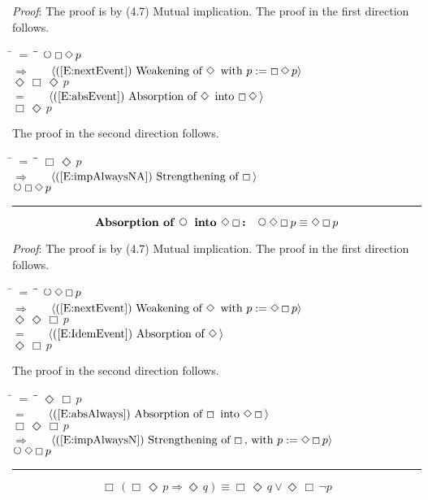\documentclass[12pt, fleqn, leqno]{article}
\newcommand{\lgap}{2pt}                             %
\newcommand{\mymathindent}{24pt}                    %
\newcommand{\impl}{\ensuremath{\Rightarrow}}        %
\newcommand{\Next}{\;\,\text{\raisebox{3.5pt}{\circle{6}}}}
\newcommand{\Event}{\Diamond\,}
\newcommand{\Always}{\Box\,}
\newcommand{\myqed}{\rule[-.23ex]{1.2ex}{2.0ex}}
\newcommand{\myqedtab}{\hspace{384pt}}              %
\newcommand{\Gll} {\langle}                         %
\newcommand{\Ggg} {\rangle}                         %
\newcommand{\Hint}[1]     {\ \ \ $\Gll              \mbox{#1} \Ggg$ }   %
\begin{document}
\emph{Proof}: The proof is by (4.7) Mutual implication.
The proof in the first direction follows.
\begin{tabbing}
\hspace{\mymathindent} \= $= \;$ \= \myqedtab \= \kill
  \> \>   $\Next\Always\Event p$\\[\lgap]
  \> $\impl$  \>  \Hint{(\ref{E:nextEvent}) Weakening of $\Event$ with $p := \Always \Event p$}\\[\lgap]
  \> \>   $\Event\Always\Event p$\\[\lgap]
  \> $=$  \>  \Hint{(\ref{E:absEvent}) Absorption of $\Event$ into $\Always\Event$}\\[\lgap]
  \> \>   $\Always\Event p$
\end{tabbing}
The proof in the second direction follows.
\begin{tabbing}
\hspace{\mymathindent} \= $= \;$ \= \myqedtab \= \kill
  \> \>   $\Always\Event p$\\[\lgap]
  \> $\impl$  \>  \Hint{(\ref{E:impAlwaysNA}) Strengthening of $\Always$}\\[\lgap]
  \> \>   $\Next\Always\Event p$ \quad \myqed
\end{tabbing}
\begin{equation}\label{E:absNextEventAlways}
\textbf{Absorption of $\Next$ into $\Event\Always$:}\quad \Next\Event\Always p \equiv \Event\Always p
\end{equation}

\emph{Proof}: The proof is by (4.7) Mutual implication.
The proof in the first direction follows.
\begin{tabbing}
\hspace{\mymathindent} \= $= \;$ \= \myqedtab \= \kill
  \> \>   $\Next\Event\Always p$\\[\lgap]
  \> $\impl$  \>  \Hint{(\ref{E:nextEvent}) Weakening of $\Event$ with $p :=  \Event\Always p$}\\[\lgap]
  \> \>   $\Event\Event\Always p$\\[\lgap]
  \> $=$  \>  \Hint{(\ref{E:IdemEvent}) Absorption of $\Event$}\\[\lgap]
  \> \>   $\Event\Always p$
\end{tabbing}
The proof in the second direction follows.
\begin{tabbing}
\hspace{\mymathindent} \= $= \;$ \= \myqedtab \= \kill
  \> \>   $\Event\Always p$\\[\lgap]
  \> $=$  \>  \Hint{(\ref{E:absAlways}) Absorption of $\Always$ into $\Event\Always$}\\[\lgap]
  \> \>   $\Always\Event\Always p$\\[\lgap]
  \> $\impl$  \>  \Hint{(\ref{E:impAlwaysN}) Strengthening of $\Always$, with $p := \Event\Always p$}\\[\lgap]
  \> \>   $\Next\Event\Always p$ \quad \myqed
\end{tabbing}
\begin{equation}\label{E:BenAriequiv1}
\Always (\Always\Event p \impl \Event q) \equiv \Always\Event q \lor \Event\Always\neg p
\end{equation}
\end{document}
